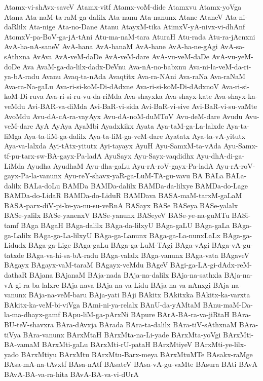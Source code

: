 {Atamx-vi-shAvx-saveV
Atamx-vitf
Atamx-voM-dide
Atamxvu
Atamx-yoVga
Atana
Ata-naM-ta-raM-ga-dalilx
Ata-nanu
Ata-nanunx
Atane
AtaneV
Ata-ni-daRlilx
Ata-nige
Ata-no-Dane
Atanu
AtayxM-tika
AtimxV-yA-nivx-vi-dhAnf
AtomxV-pa-BoV-ga-jA-tAni
Atu-ma-naM-tara
AturaH
Atu-rada
Atu-ra-jAcnxni
AvA-ha-nA-saneV
AvA-hana
AvA-hanaM
AvA-hane
AvA-ha-ne-gAgi
AvA-sa-sAthxna
AvAva
AvA-veM-daDe
AvA-veM-dare
AvA-vu-veM-daDe
AvA-vu-yeM-doDe
Ava
AvaM-ga-da-lilx-dadx-DeVnu
Ava-nA-no-babxnu
Ava-ni-la-veM-da-ri-ya-bA-radu
Avanu
Avaq-ta-nAda
Avaqtitx
Ava-ra-NAni
Ava-raNa
Ava-raNaM
Ava-ra-Na-gaLu
Ava-ri-si-koM-Di-dAdxne
Ava-ri-si-koM-Di-dAdxnoV
Ava-ri-si-koM-Di-ruva
Ava-ri-si-ru-vu-da-riMda
Ava-shayxka
Ava-shayx-kate
Ava-shayx-ka-veMdu
Avi-BAR-va-diMda
Avi-BaR-vi-sida
Avi-BaR-vi-sive
Avi-BaR-vi-su-vaMte
AvoMdu
Avu-dA-cA-ra-vayAyx
Avu-dA-noM-duMToV
Avu-deM-dare
Avudu
Avu-veM-dare
AyA
AyAya
AyaMbi
Ayadxkikx
Ayata
Aya-taM-ga-La-lalxde
Aya-ta-liMga
Aya-ta-liM-ga-dalilx
Aya-ta-liM-ga-veM-dare
Ayatatx
Aya-ta-vA-yitutx
Aya-va-lalxda
Ayi-tAtx-yitutx
Ayi-tayayx
AyuH
Ayu-SamxM-ta-vAda
Ayu-Samx-tf-pu-tarx-sw-BA-gayx-Pa-ladA
AyuSayx
Ayu-Sayx-vaqdidhx
Ayu-dhA-di-ga-LiMda
Ayudha
AyudhaM
Ayu-dha-gaLu
Ayu-rA-roV-gayx-Pa-ladA
Ayu-rA-roV-gayx-Pa-la-vanunx
Ayu-reY-shavx-yaR-ga-LuM-TA-gu-vavu
BA
BALa
BALa-dalilx
BALa-doLu
BAMDa
BAMDa-dalilx
BAMDa-da-lilxye
BAMDa-do-Lage
BAMDa-do-LidaR
BAMDa-do-LiduR
BAMDava
BASA-maM-tarxM-gaLaM
BASA-parx-diV-pi-ke-ya-nu-su-veRnA
BASayx
BASe
BASeya
BASe-yalalx
BASe-yalilx
BASe-yanenxV
BASe-yanunx
BASeyeV
BASe-ye-na-guMTu
BASi-tamf
BAga
BAgaH
BAga-dalilx
BAga-da-lilxyU
BAga-gaLU
BAga-gaLa
BAga-ga-Lalilx
BAga-ga-La-lilxyU
BAga-ga-Lanunx
BAga-ga-La-nunxLaLx
BAga-ga-Lidudx
BAga-ga-Lige
BAga-gaLu
BAga-ga-LuM-TAgi
BAga-vAgi
BAga-vA-gu-tatxde
BAga-va-hi-sa-bA-radu
BAga-valalx
BAga-vanunx
BAga-vata
BAgaveV
BAgayx
BAgayx-vaM-taraM
BAgayx-veMdu
BAgeV
BAgi-ga-LA-gi-dAdx-reM-dathaR
BAjana
BAjanaM
BAja-nada
BAja-na-dalilx
BAja-na-sathxla
BAja-na-vA-gi-ra-ba-lalxre
BAja-nava
BAja-na-va-Lidu
BAja-na-va-nAnxgi
BAja-na-vanunx
BAja-na-veM-baru
BAja-yati
BAji
BAkitx
BAkitxka
BAkitx-ka-varxta
BAkitx-ka-veM-bi-viVga
BAmi-ni-ya-relalx
BAnU-da-yAMtaM
BAnu-maM-Da-la-ma-dhayx-gamf
BApu-liM-ga-pArxNi
BApure
BArA-BA-ra-va-jiRtaH
BAra-BU-teV-shavxra
BAra-dAvxja
BArada
BAra-ta-dalilx
BAra-tiV-sAthxnaM
BAra-tiVya
BAra-vanunx
BArxMtaH
BArxMta-na-Li-yade
BArxMta-yoVgi
BArxMti-BA-vamaM
BArxMti-gaLu
BArxMti-rU-pataH
BArxMtiyeV
BArxMti-ye-lilx-yado
BArxMtiyu
BArxMtu
BArxMtu-Barx-meya
BArxMtuMTe
BAsakx-raMge
BAsa-mA-na-tAvxtf
BAsa-nAtf
BAsateV
BAsa-vA-gu-vaMte
BAsura
BAti
BAvA
BAvA-BA-va-ra-hita
BAvA-BA-va-vi-dUrA
}
